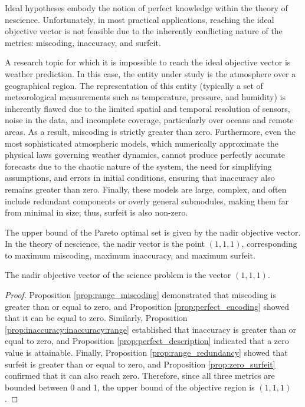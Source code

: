 Ideal hypotheses embody the notion of perfect knowledge within the theory of nescience. Unfortunately, in most practical applications, reaching the ideal objective vector is not feasible due to the inherently conflicting nature of the metrics: miscoding, inaccuracy, and surfeit.

\begin{example}
A research topic for which it is impossible to reach the ideal objective vector is weather prediction. In this case, the entity under study is the atmosphere over a geographical region. The representation of this entity (typically a set of meteorological measurements such as temperature, pressure, and humidity) is inherently flawed due to the limited spatial and temporal resolution of sensors, noise in the data, and incomplete coverage, particularly over oceans and remote areas. As a result, miscoding is strictly greater than zero. Furthermore, even the most sophisticated atmospheric models, which numerically approximate the physical laws governing weather dynamics, cannot produce perfectly accurate forecasts due to the chaotic nature of the system, the need for simplifying assumptions, and errors in initial conditions, ensuring that inaccuracy also remains greater than zero. Finally, these models are large, complex, and often include redundant components or overly general submodules, making them far from minimal in size; thus, surfeit is also non-zero.
\end{example}

The upper bound of the Pareto optimal set is given by the nadir objective vector. In the theory of nescience, the nadir vector is the point $(1, 1, 1)$, corresponding to maximum miscoding, maximum inaccuracy, and maximum surfeit.

\begin{proposition}
The nadir objective vector of the science problem is the vector $(1, 1, 1)$.
\end{proposition}
\begin{proof}
Proposition \ref{prop:range_miscoding} demonstrated that miscoding is greater than or equal to zero, and Proposition \ref{prop:perfect_encoding} showed that it can be equal to zero. Similarly, Proposition \ref{prop:inaccuracy:inaccuracy:range} established that inaccuracy is greater than or equal to zero, and Proposition \ref{prop:perfect_description} indicated that a zero value is attainable. Finally, Proposition \ref{prop:range_redundancy} showed that surfeit is greater than or equal to zero, and Proposition \ref{prop:zero_surfeit} confirmed that it can also reach zero. Therefore, since all three metrics are bounded between 0 and 1, the upper bound of the objective region is $(1, 1, 1)$.
\end{proof}

